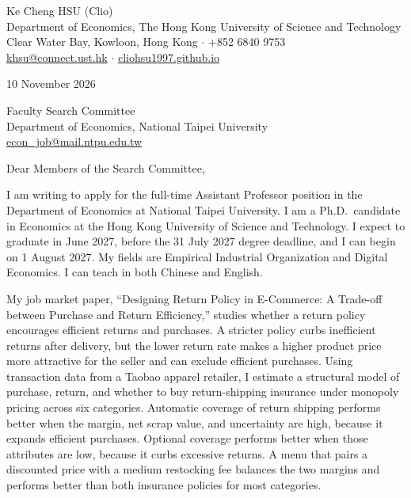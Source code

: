 \documentclass[11pt]{article}
\begin{document}
\begin{flushleft}
Ke Cheng HSU (Clio) \\
Department of Economics, The Hong Kong University of Science and Technology \\
Clear Water Bay, Kowloon, Hong Kong $\cdot$ +852 6840 9753 \\
\href{mailto:khsu@connect.ust.hk}{khsu@connect.ust.hk} $\cdot$ \href{https://cliohsu1997.github.io/}{cliohsu1997.github.io}
\end{flushleft}

10 November 2026

\vspace{0.2em}
Faculty Search Committee \\
Department of Economics, National Taipei University \\
\href{mailto:econ_job@mail.ntpu.edu.tw}{econ\_job@mail.ntpu.edu.tw}

\vspace{0.2em}
Dear Members of the Search Committee,

I am writing to apply for the full-time Assistant Professor position in the Department of Economics at National Taipei University. I am a Ph.D.\ candidate in Economics at the Hong Kong University of Science and Technology. I expect to graduate in June 2027, before the 31 July 2027 degree deadline, and I can begin on 1 August 2027. My fields are Empirical Industrial Organization and Digital Economics. I can teach in both Chinese and English.

My job market paper, ``Designing Return Policy in E-Commerce: A Trade-off between Purchase and Return Efficiency,'' studies whether a return policy encourages efficient returns and purchases. A stricter policy curbs inefficient returns after delivery, but the lower return rate makes a higher product price more attractive for the seller and can exclude efficient purchases. Using transaction data from a Taobao apparel retailer, I estimate a structural model of purchase, return, and whether to buy return-shipping insurance under monopoly pricing across six categories. Automatic coverage of return shipping performs better when the margin, net scrap value, and uncertainty are high, because it expands efficient purchases. Optional coverage performs better when those attributes are low, because it curbs excessive returns. A menu that pairs a discounted price with a medium restocking fee balances the two margins and performs better than both insurance policies for most categories.
\end{document}
